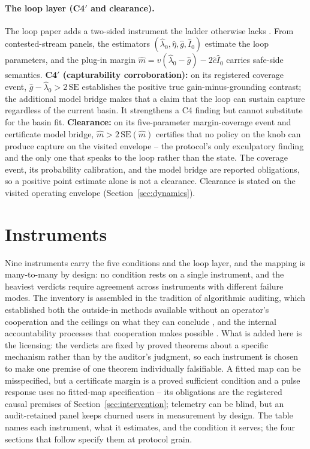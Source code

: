 \documentclass[11pt]{article}
\theoremstyle{definition}
\theoremstyle{remark}
\numberwithin{equation}{section}
\begin{document}
\paragraph{The loop layer (C4$'$ and clearance).} The loop paper adds a two-sided instrument the ladder otherwise lacks \citep{hofheinz2026loops}. From contested-stream panels, the estimators $(\hat\lambda_0, \hat\eta, \hat g, \hat I_0)$ estimate the loop parameters, and the plug-in margin $\hat m = \hat v(\hat\lambda_0 - \hat g) - 2\hat c\hat I_0$ carries safe-side semantics. \textbf{C4$'$ (capturability corroboration):} on its registered coverage event, $\hat g - \hat\lambda_0 > 2\,\mathrm{SE}$ establishes the positive true gain-minus-grounding contrast; the additional model bridge makes that a claim that the loop can sustain capture regardless of the current basin. It strengthens a C4 finding but cannot substitute for the basin fit. \textbf{Clearance:} on its five-parameter margin-coverage event and certificate model bridge, $\hat m > 2\,\mathrm{SE}(\hat m)$ certifies that no policy on the knob can produce capture on the visited envelope -- the protocol's only exculpatory finding and the only one that speaks to the loop rather than the state. The coverage event, its probability calibration, and the model bridge are reported obligations, so a positive point estimate alone is not a clearance. Clearance is stated on the visited operating envelope (Section~\ref{sec:dynamics}).

\section{Instruments}\label{sec:instruments}

Nine instruments carry the five conditions and the loop layer, and the mapping is many-to-many by design: no condition rests on a single instrument, and the heaviest verdicts require agreement across instruments with different failure modes. The inventory is assembled in the tradition of algorithmic auditing, which established both the outside-in methods available without an operator's cooperation and the ceilings on what they can conclude \citep{metaxa2021auditing}, and the internal accountability processes that cooperation makes possible \citep{raji2020closing}. What is added here is the licensing: the verdicts are fixed by proved theorems about a specific mechanism rather than by the auditor's judgment, so each instrument is chosen to make one premise of one theorem individually falsifiable. A fitted map can be misspecified, but a certificate margin is a proved sufficient condition and a pulse response uses no fitted-map specification -- its obligations are the registered causal premises of Section~\ref{sec:intervention}; telemetry can be blind, but an audit-retained panel keeps churned users in measurement by design. The table names each instrument, what it estimates, and the condition it serves; the four sections that follow specify them at protocol grain.
\end{document}

